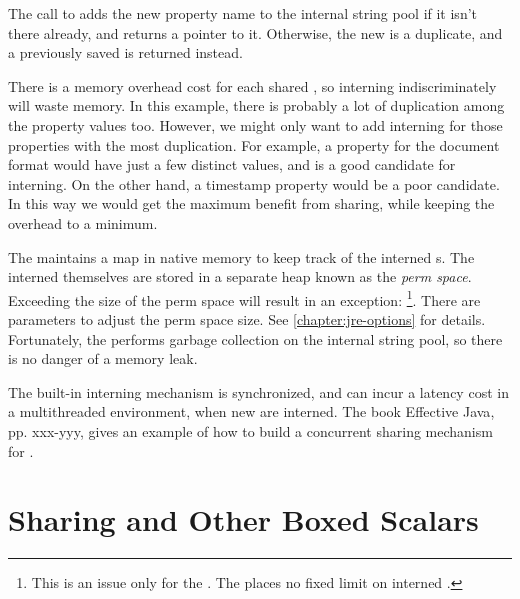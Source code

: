 The call to  adds the new property name 
to the internal string
pool if it isn't there already, and returns a pointer to it. Otherwise, the
new  is a duplicate, and a previously saved  is
returned instead. 

There is a memory overhead cost for each shared
, so interning  indiscriminately will waste memory.
In this example, there is probably a lot of duplication
among the property values too. However, we might only want to
add interning for those properties with the most duplication. For example, a property
for the document format would have just a few distinct values, and is a good
candidate for interning.
On the other hand, a timestamp property would be a poor candidate. In this way
we would get the maximum benefit from sharing, while keeping the overhead to a
minimum. 

The \jre maintains a map in native memory to keep track of the interned
s.
The interned  themselves are stored in a separate heap known as
the \emph{perm space}. 
Exceeding the size of the perm space will result in an exception:
\footnote{This is an issue only for the \oracle \jre. The \ibm \jre places no 
fixed limit on interned .}.
There are parameters to adjust the perm space size. See \autoref{chapter:jre-options} for details. 
Fortunately, the \jre performs garbage collection on the
internal string pool, so there is no danger of a memory leak.

The built-in interning mechanism is synchronized, and can incur a latency cost
in a multithreaded environment, when new  are interned.
The book Effective Java\cite{EffectiveJavaBook}, pp. xxx-yyy, gives an example
of how to build a concurrent sharing mechanism for .

\section{Sharing  and Other Boxed Scalars}

